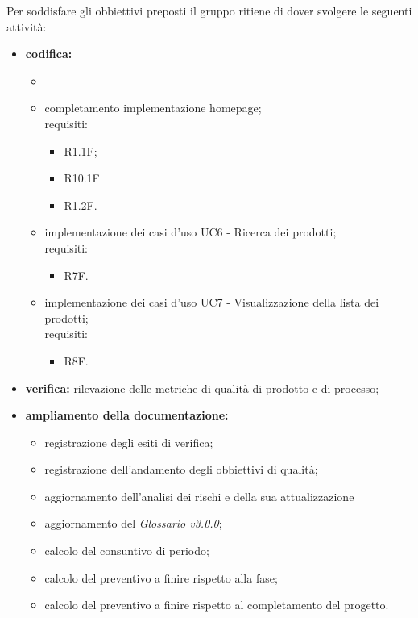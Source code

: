 Per soddisfare gli obbiettivi preposti il gruppo ritiene di dover svolgere le seguenti attività:
\begin{itemize}
    \item \textbf{codifica:} \begin{itemize}
              \item \item completamento implementazione homepage;\\ requisiti:
                    \begin{itemize}
                        \item R1.1F;                                                                   \item R10.1F
                        \item R1.2F.
                    \end{itemize}
              \item implementazione dei casi d'uso UC6 - Ricerca dei prodotti;\\ requisiti:
                    \begin{itemize}
                        \item R7F.
                    \end{itemize}
              \item implementazione dei casi d'uso UC7 - Visualizzazione della lista dei prodotti;\\ requisiti:
                    \begin{itemize}
                        \item R8F.
                    \end{itemize}
          \end{itemize}
    \item \textbf{verifica:} rilevazione delle metriche di qualità di prodotto e di processo;
    \item \textbf{ampliamento della documentazione:}
          \begin{itemize}
              \item registrazione degli esiti di verifica;
              \item registrazione dell'andamento degli obbiettivi di qualità;
              \item aggiornamento dell'analisi dei rischi e della sua attualizzazione
              \item aggiornamento del \textit{Glossario v3.0.0};
              \item calcolo del consuntivo di periodo;
              \item calcolo del preventivo a finire rispetto alla fase;
              \item calcolo del preventivo a finire rispetto al completamento del progetto.
          \end{itemize}
\end{itemize}

